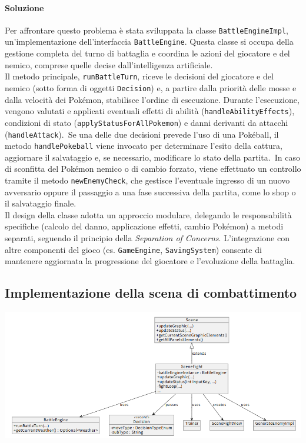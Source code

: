 \documentclass[a4paper,12pt]{report}
\begin{document}
{{\paragraph{Soluzione}
Per affrontare questo problema è stata sviluppata la classe\linebreak 
\texttt{BattleEngineImpl}, un’implementazione dell’interfaccia \texttt{BattleEngine}. Questa classe si occupa della gestione completa del turno di battaglia e coordina le azioni del giocatore e del nemico, comprese quelle decise dall'intelligenza artificiale.\\
Il metodo principale, \texttt{runBattleTurn}, riceve le decisioni del giocatore e del nemico (sotto forma di oggetti \texttt{Decision}) e, a partire dalla priorità delle mosse e dalla velocità dei Pokémon, stabilisce l’ordine di esecuzione. Durante l’esecuzione, vengono valutati e applicati eventuali effetti di abilità (\texttt{handleAbilityEffects}), condizioni di stato (\texttt{applyStatusForAllPokemon}) e danni derivanti da attacchi (\texttt{handleAttack}).\
Se una delle due decisioni prevede l’uso di una Pokéball, il metodo \texttt{handlePokeball} viene invocato per determinare l’esito della cattura, aggiornare il salvataggio e, se necessario, modificare lo stato della partita.\
In caso di sconfitta del Pokémon nemico o di cambio forzato, viene effettuato un controllo tramite il metodo \verb|newEnemyCheck|, che gestisce l’eventuale ingresso di un nuovo avversario oppure il passaggio a una fase successiva della partita, come lo shop o il salvataggio finale.\\
Il design della classe adotta un approccio modulare, delegando le responsabilità specifiche (calcolo del danno, applicazione effetti, cambio Pokémon) a metodi separati, seguendo il principio della \textit{Separation of Concerns}. L’integrazione con altre componenti del gioco (es. \texttt{GameEngine}, \texttt{SavingSystem}) consente di mantenere aggiornata la progressione del giocatore e l’evoluzione della battaglia.

\subsection*{Implementazione della scena di combattimento}
\includegraphics[width=\textwidth]{immagini/sceneFightUML.png}

}}
\end{document}
